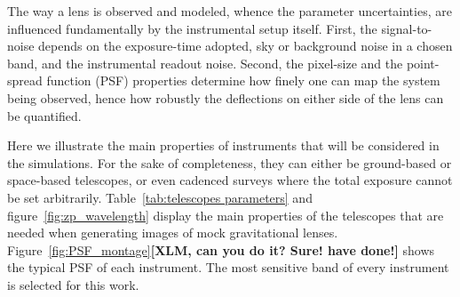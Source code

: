 \documentclass[a4paper,11pt]{article}
\begin{document}
The way a lens is observed and modeled, whence the parameter
uncertainties, are influenced fundamentally by the instrumental setup
itself. First, the signal-to-noise depends on the exposure-time
adopted, sky or background noise in a chosen band, and the
instrumental readout noise. Second, the pixel-size and the
point-spread function (PSF) properties determine how finely one can
map the system being observed, hence how robustly the deflections on
either side of the lens can be quantified.
 
Here we illustrate the main properties of instruments that will be
considered in the simulations. For the sake of completeness, they can
either be ground-based or space-based telescopes, or even cadenced
surveys where the total exposure cannot be set arbitrarily.
Table~\ref{tab:telescopes parameters} and
figure~\ref{fig:zp_wavelength} display the main properties of the
telescopes that are needed when generating images of mock
gravitational lenses. Figure~\ref{fig:PSF_montage}\textbf{[XLM, can
you do it? Sure! have done!]} shows the typical PSF of each
instrument. The most sensitive band of every instrument is selected
for this work.
\end{document}
